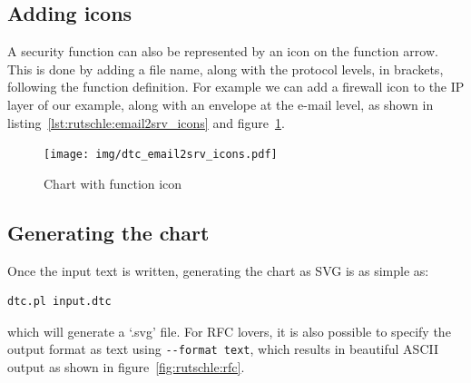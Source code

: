 \documentclass{article}
\begin{document}
\subsection{Adding icons}

A security function can also be represented by an icon on the function arrow. This is done by adding a file name, along with the protocol levels, in brackets, following the function definition. For example we can add a firewall icon to the IP layer of our example, along with an envelope at the e-mail level, as shown in listing~\ref{lst:rutschle:email2srv_icons} and figure~\ref{fig:rutschle:email2srv_icons}.





    
\begin{figure}[ht]
	\centering
	\texttt{[image: img/dtc\_email2srv\_icons.pdf]}
	\caption{Chart with function icon}
	\label{fig:rutschle:email2srv_icons}
\end{figure}


    
\subsection{Generating the chart}

Once the input text is written, generating the chart as SVG is as simple as:

    \begin{lstlisting}[language={},caption={Running DTC},label={lst:rutschle:dtc_run}]
        dtc.pl input.dtc
    \end{lstlisting}

    which will generate a `.svg' file. For RFC lovers, it is also possible
    to specify the output format as text using \verb+--format text+, which
    results in beautiful ASCII output as shown in
    figure~\ref{fig:rutschle:rfc}.
\end{document}
